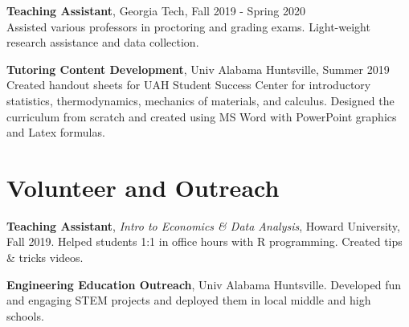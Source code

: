 \documentclass[margin,line]{res}
\begin{document}
\begin{resume}
    {\bf Teaching Assistant}, Georgia Tech, Fall 2019 - Spring 2020\\
    {Assisted various professors in proctoring and grading exams. Light-weight research assistance and data collection.}
    
    {\bf Tutoring Content Development}, Univ Alabama Huntsville, Summer 2019\\
    {Created handout sheets for UAH Student Success Center for introductory statistics, thermodynamics, mechanics of materials, and calculus. Designed the curriculum from scratch and created using MS Word with PowerPoint graphics and Latex formulas.}

\vspace{.75cm}
\section{\sc Volunteer and Outreach}

{\bf Teaching Assistant}, {\it Intro to Economics \& Data Analysis}, Howard University, Fall 2019.
{Helped students 1:1 in office hours with R programming. Created tips \& tricks videos.}

{\bf Engineering Education Outreach}, Univ Alabama Huntsville.
{Developed fun and engaging STEM projects and deployed them in local middle and high schools.}


\end{resume}
\end{document}
